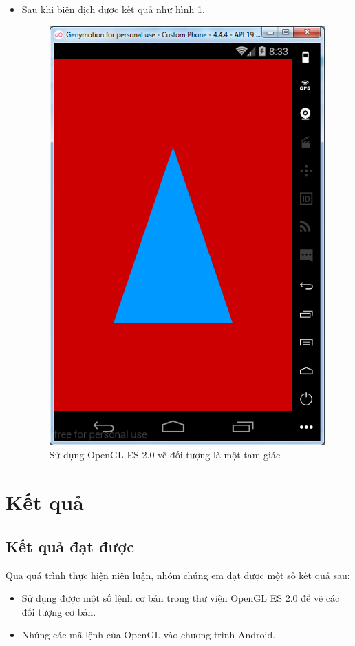 \documentclass[13pt,a4paper]{extreport}
\begin{document}
\begin{itemize}
\newpage		
		\item Sau khi biên dịch được kết quả như hình \ref{Fig:opengles-2}.
				\begin{figure}[!h]
					\begin{center}
						\includegraphics[scale=.6]{images/opengles-2.png}
					\end{center}
					\caption{Sử dụng OpenGL ES 2.0 vẽ đối tượng là một tam giác} \label{Fig:opengles-2}
				\end{figure}
	\end{itemize}

\chapter{Kết quả}
\section{Kết quả đạt được}
	Qua quá trình thực hiện niên luận, nhóm chúng em đạt được một số kết quả sau:
		\begin{itemize}
			\item Sử dụng được một số lệnh cơ bản trong thư viện OpenGL ES 2.0 để vẽ các đối tượng cơ bản.
			
			\item Nhúng các mã lệnh của OpenGL vào chương trình Android.
		\end{itemize}
\end{document}
